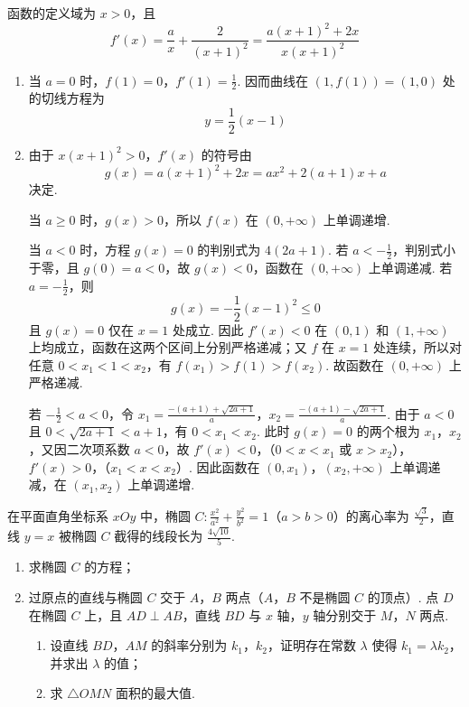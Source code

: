 \begin{solution}
函数的定义域为 \(x>0\)，且
\[
f'(x)=\frac{a}{x}+\frac{2}{(x+1)^{2}}=\frac{a(x+1)^{2}+2x}{x(x+1)^{2}}
\]

\begin{enumerate}
\item 当 \(a=0\) 时，\(f(1)=0\)，\(f'(1)=\frac12\). 因而曲线在 \((1,f(1))=(1,0)\) 处的切线方程为
\[
y=\frac12(x-1)
\]

\item 由于 \(x(x+1)^{2}>0\)，\(f'(x)\) 的符号由
\[
g(x)=a(x+1)^{2}+2x=ax^{2}+2(a+1)x+a
\]
决定.

当 \(a\geqslant0\) 时，\(g(x)>0\)，所以 \(f(x)\) 在 \((0,+\infty)\) 上单调递增.

当 \(a<0\) 时，方程 \(g(x)=0\) 的判别式为 \(4(2a+1)\). 若 \(a<-\frac12\)，判别式小于零，且 \(g(0)=a<0\)，故 \(g(x)<0\)，函数在 \((0,+\infty)\) 上单调递减. 若 \(a=-\frac12\)，则
\[
g(x)=-\frac12(x-1)^{2}\leqslant0
\]
且 \(g(x)=0\) 仅在 \(x=1\) 处成立. 因此 \(f'(x)<0\) 在 \((0,1)\) 和 \((1,+\infty)\) 上均成立，函数在这两个区间上分别严格递减；又 \(f\) 在 \(x=1\) 处连续，所以对任意 \(0<x_1<1<x_2\)，有 \(f(x_1)>f(1)>f(x_2)\). 故函数在 \((0,+\infty)\) 上严格递减.

若 \(-\frac12<a<0\)，令
\(x_{1}=\frac{-(a+1)+\sqrt{2a+1}}{a}\)，\(x_{2}=\frac{-(a+1)-\sqrt{2a+1}}{a}\).
由于 \(a<0\) 且 \(0<\sqrt{2a+1}<a+1\)，有 \(0<x_{1}<x_{2}\). 此时 \(g(x)=0\) 的两个根为 \(x_{1}\)，\(x_{2}\)，又因二次项系数 \(a<0\)，故
\(f'(x)<0\)，（\(0<x<x_{1}\text{ 或 }x>x_{2}\)），\(f'(x)>0\)，（\(x_{1}<x<x_{2}\)）.
因此函数在 \((0,x_{1})\)，\((x_{2},+\infty)\) 上单调递减，在 \((x_{1},x_{2})\) 上单调递增.
\end{enumerate}
\end{solution}

\begin{problem}
在平面直角坐标系 \(xOy\) 中，椭圆 \(C: \frac{x^2}{a^2} + \frac{y^2}{b^2} = 1\)（\(a > b > 0\)）的离心率为 \(\frac{\sqrt{3}}{2}\)，直线 \(y = x\) 被椭圆 \(C\) 截得的线段长为 \(\frac{4\sqrt{10}}{5}\).

\begin{enumerate}
\item 求椭圆 \(C\) 的方程；
\item 过原点的直线与椭圆 \(C\) 交于 \(A\)，\(B\) 两点（\(A\)，\(B\) 不是椭圆 \(C\) 的顶点）. 点 \(D\) 在椭圆 \(C\) 上，且 \(AD \perp AB\)，直线 \(BD\) 与 \(x\) 轴，\(y\) 轴分别交于 \(M\)，\(N\) 两点.
\begin{enumerate}
\item 设直线 \(BD\)，\(AM\) 的斜率分别为 \(k_{1}\)，\(k_{2}\)，证明存在常数 \(\lambda\) 使得 \(k_{1} = \lambda k_{2}\)，并求出 \(\lambda\) 的值；
\item 求 \(\triangle OMN\) 面积的最大值.
\end{enumerate}
\end{enumerate}
\end{problem}

